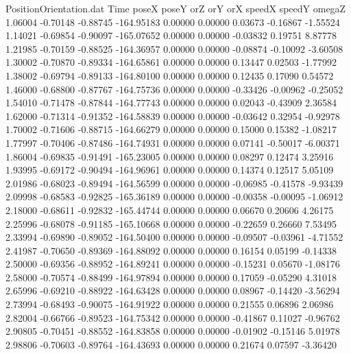 \begin{filecontents}{PositionOrientation.dat}
Time poseX poseY orZ orY orX speedX speedY omegaZ
   1.06004   -0.70148   -0.88745  -164.95183    0.00000    0.00000    0.03673   -0.16867   -1.55524
   1.14021   -0.69854   -0.90097  -165.07652    0.00000    0.00000   -0.03832    0.19751    8.87778
   1.21985   -0.70159   -0.88525  -164.36957    0.00000    0.00000   -0.08874   -0.10092   -3.60508
   1.30002   -0.70870   -0.89334  -164.65861    0.00000    0.00000    0.13447    0.02503   -1.77992
   1.38002   -0.69794   -0.89133  -164.80100    0.00000    0.00000    0.12435    0.17090    0.54572
   1.46000   -0.68800   -0.87767  -164.75736    0.00000    0.00000   -0.33426   -0.00962   -0.25052
   1.54010   -0.71478   -0.87844  -164.77743    0.00000    0.00000    0.02043   -0.43909    2.36584
   1.62000   -0.71314   -0.91352  -164.58839    0.00000    0.00000   -0.03642    0.32954   -0.92978
   1.70002   -0.71606   -0.88715  -164.66279    0.00000    0.00000    0.15000    0.15382   -1.08217
   1.77997   -0.70406   -0.87486  -164.74931    0.00000    0.00000    0.07141   -0.50017   -6.00371
   1.86004   -0.69835   -0.91491  -165.23005    0.00000    0.00000    0.08297    0.12474    3.25916
   1.93995   -0.69172   -0.90494  -164.96961    0.00000    0.00000    0.14374    0.12517    5.05109
   2.01986   -0.68023   -0.89494  -164.56599    0.00000    0.00000   -0.06985   -0.41578   -9.93439
   2.09998   -0.68583   -0.92825  -165.36189    0.00000    0.00000   -0.00358   -0.00095   -1.06912
   2.18000   -0.68611   -0.92832  -165.44744    0.00000    0.00000    0.06670    0.20606    4.26175
   2.25996   -0.68078   -0.91185  -165.10668    0.00000    0.00000   -0.22659    0.26660    7.53495
   2.33994   -0.69890   -0.89052  -164.50400    0.00000    0.00000   -0.09507   -0.03961   -4.71552
   2.41987   -0.70650   -0.89369  -164.88092    0.00000    0.00000    0.16154    0.05199   -0.14338
   2.50000   -0.69356   -0.88952  -164.89241    0.00000    0.00000   -0.15231    0.05670   -1.08176
   2.58000   -0.70574   -0.88499  -164.97894    0.00000    0.00000    0.17059   -0.05290    4.31018
   2.65996   -0.69210   -0.88922  -164.63428    0.00000    0.00000    0.08967   -0.14420   -3.56294
   2.73994   -0.68493   -0.90075  -164.91922    0.00000    0.00000    0.21555    0.06896    2.06986
   2.82004   -0.66766   -0.89523  -164.75342    0.00000    0.00000   -0.41867    0.11027   -0.96762
   2.90805   -0.70451   -0.88552  -164.83858    0.00000    0.00000   -0.01902   -0.15146    5.01978
   2.98806   -0.70603   -0.89764  -164.43693    0.00000    0.00000    0.21674    0.07597   -3.36420

\end{filecontents}
